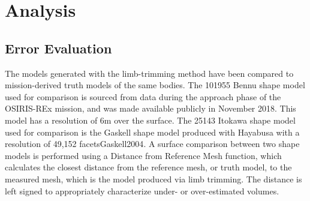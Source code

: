 \section{Analysis}
\subsection{Error Evaluation}
The models generated with the limb-trimming method have been compared to mission-derived truth models of the same bodies. The 101955 Bennu shape model used for comparison is sourced from data during the approach phase of the OSIRIS-REx mission, and was made available publicly in November 2018{}. This model has a resolution of 6m over the surface. The 25143 Itokawa shape model used for comparison is the Gaskell shape model produced with Hayabusa with a resolution of 49,152 facets{Gaskell2004}. A surface comparison between two shape models is performed using a Distance from Reference Mesh function, which calculates the closest distance from the reference mesh, or truth model, to the measured mesh, which is the model produced via limb trimming. The distance is left signed to appropriately characterize under- or over-estimated volumes. 


          
          
          
